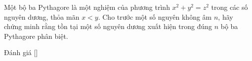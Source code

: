 \ifshowproblem
\begin{problem}\label{problem:ROU-2015-TST-D1-P3}
    Một bộ ba Pythagore là một nghiệm của phương trình \( x^2 + y^2 = z^2 \) trong các số nguyên dương, thỏa mãn \( x < y \).
    Cho trước một số nguyên không âm \( n \), hãy chứng minh rằng tồn tại một số nguyên dương xuất hiện trong đúng \( n \) bộ ba Pythagore phân biệt.
\end{problem}
\fi

\ifshowinfo
Đánh giá [\textbf{}]\footnotemark
{}
\fi